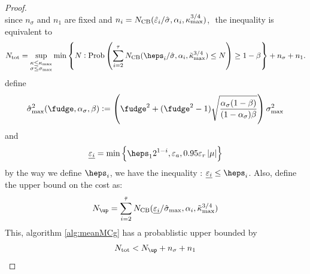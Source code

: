 \documentclass{iitthesis}
\begin{document}
\begin{proof}
\begin{equation*}
\end{equation*}
since $n_\sigma$ and $n_1$ are fixed and $n_i =  N_{\text{CB}}(\hat{\varepsilon}_{i}/\hat{\sigma},\alpha_{i},\kappa_{\max}^{3/4})$, $ $ the inequality is equivalent to 
\begin{equation*}
N_{\text{tot}} = \sup_{\substack{\kappa \le \kappa_{\max} \\ \sigma \le \sigma_{\max}}} \min\left\{N : \Prob\left(\sum_{i=2}^\tau N_{\text{CB}}(\heps_i/\hsigma,\alpha_i,\tilde\kappa_{\max}^{3/4}) \le N\right) \ge 1-\beta  \right \}+n_{\sigma} + n_1.
\end{equation*}
define 
\begin{align}\label{sigmax}
\hsigma_{\max}^2 (\fudge, \alpha_{\sigma},\beta) := \left(\fudge^2+(\fudge^2-1)\sqrt{\frac{\alpha_{\sigma}(1-\beta)}{(1-\alpha_{\sigma})\beta}}\right)\sigma_{\max}^2
\end{align}
and
\begin{align}
  \underline{\varepsilon_i} = \min \left \{ \heps_12^{1-i},\varepsilon_a, 0.95\varepsilon_r\abs{\mu} \right \}
\end{align}
by the way we define $\heps_i$, we have the inequality : $\underline{\varepsilon_i}\leq \heps_i$.
Also, define the upper bound on the cost as:
$$N_{\up} = \sum_{i=2}^{\bar{\tau}} N_{\text{CB}}(\underline{\varepsilon_i} /\hsigma_{\max},\alpha_i,\tilde\kappa_{\max}^{3/4})$$
This, algorithm \ref{alg:meanMCg} has a probablistic upper bounded by
\begin{align}
N_{\text{tot}} < N_{\up}+n_\sigma+n_1
\end{align}
\end{proof}
\end{document}
